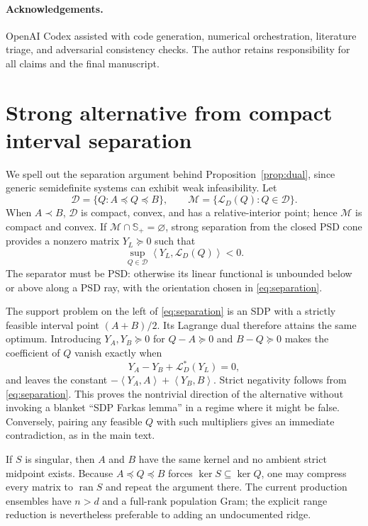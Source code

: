 \documentclass[11pt]{article}
\newcommand{\Smat}{\mathbb{S}}
\newcommand{\PSD}{\Smat_+}
\newcommand{\ip}[2]{\left\langle #1,#2\right\rangle}
\begin{document}
\paragraph{Acknowledgements.}
OpenAI Codex assisted with code generation, numerical orchestration, literature
triage, and adversarial consistency checks.  The author retains responsibility
for all claims and the final manuscript.

\appendix
\section{Strong alternative from compact interval separation}
\label{app:duality}

We spell out the separation argument behind Proposition~\ref{prop:dual}, since
generic semidefinite systems can exhibit weak infeasibility.  Let
\[
 \mathcal D=\{Q:A\preceq Q\preceq B\},\qquad
 \mathcal M=\{\mathcal L_D(Q):Q\in\mathcal D\}.
\]
When $A\prec B$, $\mathcal D$ is compact, convex, and has a relative-interior
point; hence $\mathcal M$ is compact and convex.  If
$\mathcal M\cap\PSD=\varnothing$, strong separation from the closed PSD cone
provides a nonzero matrix $Y_L\succeq0$ such that
\begin{equation}
 \sup_{Q\in\mathcal D}\ip{Y_L}{\mathcal L_D(Q)}<0.
 \label{eq:separation}
\end{equation}
The separator must be PSD: otherwise its linear functional is unbounded below
or above along a PSD ray, with the orientation chosen in
\eqref{eq:separation}.

The support problem on the left of \eqref{eq:separation} is an SDP with a
strictly feasible interval point $(A+B)/2$.  Its Lagrange dual therefore
attains the same optimum.  Introducing $Y_A,Y_B\succeq0$ for
$Q-A\succeq0$ and $B-Q\succeq0$ makes the coefficient of $Q$ vanish exactly
when
\[
 Y_A-Y_B+\mathcal L_D^*(Y_L)=0,
\]
and leaves the constant
$-\ip{Y_A}{A}+\ip{Y_B}{B}$.  Strict negativity follows from
\eqref{eq:separation}.  This proves the nontrivial direction of the alternative
without invoking a blanket ``SDP Farkas lemma'' in a regime where it might be
false.  Conversely, pairing any feasible $Q$ with such multipliers gives an
immediate contradiction, as in the main text.

If $S$ is singular, then $A$ and $B$ have the same kernel and no ambient strict
midpoint exists.  Because $A\preceq Q\preceq B$ forces
$\ker S\subseteq\ker Q$, one may compress every matrix to
$\operatorname{ran}S$ and repeat the argument there.  The current production
ensembles have $n>d$ and a full-rank population Gram; the explicit range
reduction is nevertheless preferable to adding an undocumented ridge.
\end{document}
